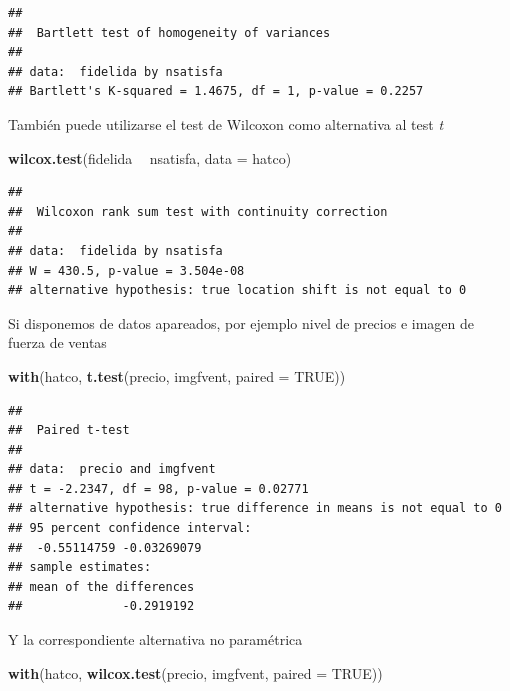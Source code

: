 \documentclass[]{book}
\newenvironment{Shaded}{\begin{snugshade}}{\end{snugshade}}
\newcommand{\KeywordTok}[1]{\textcolor[rgb]{0.13,0.29,0.53}{\textbf{#1}}}
\newcommand{\DataTypeTok}[1]{\textcolor[rgb]{0.13,0.29,0.53}{#1}}
\newcommand{\StringTok}[1]{\textcolor[rgb]{0.31,0.60,0.02}{#1}}
\newcommand{\OtherTok}[1]{\textcolor[rgb]{0.56,0.35,0.01}{#1}}
\newcommand{\OperatorTok}[1]{\textcolor[rgb]{0.81,0.36,0.00}{\textbf{#1}}}
\newcommand{\NormalTok}[1]{#1}
\begin{document}
\begin{verbatim}
## 
##  Bartlett test of homogeneity of variances
## 
## data:  fidelida by nsatisfa
## Bartlett's K-squared = 1.4675, df = 1, p-value = 0.2257
\end{verbatim}

También puede utilizarse el test de Wilcoxon como alternativa al test
\emph{t}

\begin{Shaded}
\begin{Highlighting}[]
\KeywordTok{wilcox.test}\NormalTok{(fidelida }\OperatorTok{~}\StringTok{ }\NormalTok{nsatisfa, }\DataTypeTok{data =}\NormalTok{ hatco)}
\end{Highlighting}
\end{Shaded}

\begin{verbatim}
## 
##  Wilcoxon rank sum test with continuity correction
## 
## data:  fidelida by nsatisfa
## W = 430.5, p-value = 3.504e-08
## alternative hypothesis: true location shift is not equal to 0
\end{verbatim}

Si disponemos de datos apareados, por ejemplo nivel de precios e imagen
de fuerza de ventas

\begin{Shaded}
\begin{Highlighting}[]
\KeywordTok{with}\NormalTok{(hatco, }\KeywordTok{t.test}\NormalTok{(precio, imgfvent, }\DataTypeTok{paired =} \OtherTok{TRUE}\NormalTok{))}
\end{Highlighting}
\end{Shaded}

\begin{verbatim}
## 
##  Paired t-test
## 
## data:  precio and imgfvent
## t = -2.2347, df = 98, p-value = 0.02771
## alternative hypothesis: true difference in means is not equal to 0
## 95 percent confidence interval:
##  -0.55114759 -0.03269079
## sample estimates:
## mean of the differences 
##              -0.2919192
\end{verbatim}

Y la correspondiente alternativa no paramétrica

\begin{Shaded}
\begin{Highlighting}[]
\KeywordTok{with}\NormalTok{(hatco, }\KeywordTok{wilcox.test}\NormalTok{(precio, imgfvent, }\DataTypeTok{paired =} \OtherTok{TRUE}\NormalTok{))}
\end{Highlighting}
\end{Shaded}
\end{document}
